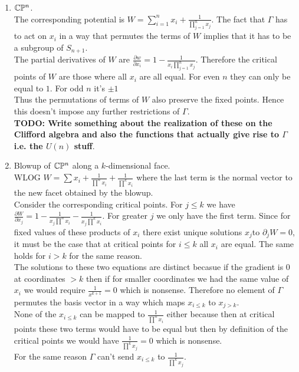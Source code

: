\documentclass[a4paper]{article}
\begin{document}
\begin{enumerate}
=======
	\item $\mathbb{C}\mathbb{P}^{n}$.\\ The corresponding potential is $W=\sum_{i=1}^{n} x_{i} + \frac{1}{\prod_{j=1}^{n} x_{j} }$. The fact that $\Gamma$ has to act on $x_{i}$ in a way that permutes the terms of $W$ implies that it has to be a subgroup of $S_{n+1}$.\\
	The partial derivatives of $W$ are $\frac{\partial w}{\partial x_{i}} =1-\frac{1}{x_{i}\prod_{j=1}^{n}x_{j}}$. Therefore the critical points of $W$ are those where all  $x_{i}$ are all equal. For even $n$ they can only be equal to $1$. For odd $n$ it's $\pm 1$\\
	Thus the permutations of terms of $W$ also preserve the fixed points. Hence this doesn't impose any further restrictions of $\Gamma$.\\
	\textbf{TODO: Write something about the realization of these on the Clifford algebra and also the functions that actually give rise to $\Gamma$ i.e. the $U(n)$ stuff}.\\
	\item Blowup of $\mathbb{C}\mathbb{P}^{n}$ along a $k$-dimensional face.\\
	WLOG $W=\sum x_{i}+\frac{1}{\prod ^n x_{i}}+\frac{1}{\prod ^k x_{i}}$ where the last term is the normal vector to the new facet obtained by the blowup.\\
	Consider the corresponding critical points. For $j\le k$ we have $\frac{\partial W}{\partial x_{j}} =1-\frac{1}{x_{j}\prod^n x_{i}} - \frac{1}{x_{j}\prod^k x_{i}}$. For greater $j$ we only have the first term.
	Since for fixed values of these products of $x_{i}$ there exist unique solutions $x_{j}$to $\partial_j W=0$, it must be the case that at critical points for $i\le k$ all $x_{i}$     are equal. The same holds for $i>k$ for the same reason. \\
	The solutions to these two equations are distinct becasue if the gradient is 0 at coordinates $>  k$ then if for smaller coordinates we had the same value of  $x_{i}$ we would require $\frac{1}{x^{k+1}}=0$ which is nonsense. Therefore  no element of $\Gamma $ permutes the basis vector in a way which maps $x_{i\le k}$ to $x_{j>k}$.\\
	None of the $x_{i\le k}$ can be mapped to $\frac{1}{\prod^n x_{i}}$ either because then at critical points these two terms would have to be equal but then by definition of the critical points we would have $\frac{1}{\prod^{k}x_{j}}=0$ which is nonsense.\\
	For the same reason $\Gamma$ can't send $x_{i\le k}$ to $\frac{1}{\prod^{k}x_{j}}$.\\

\end{enumerate}
\end{document}
